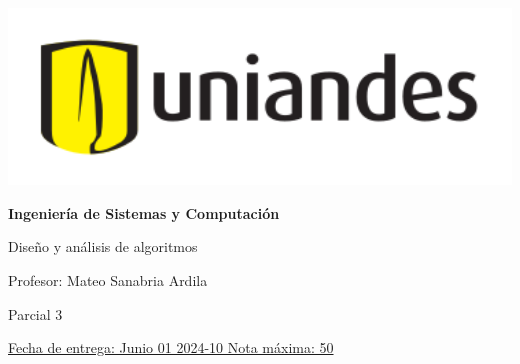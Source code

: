 \documentclass[12pt, a4paper]{exam}
\begin{document}
	\noindent
	\begin{minipage}[l]{0.1\textwidth}
		\noindent
		\includegraphics[width=1.8\textwidth]{Logosimbolo-uniandes_horizontal.png}
	\end{minipage}
\hfill
\begin{minipage}[c]{0.8\textwidth}
	\begin{center}
		{\large \textbf{Ingeniería de Sistemas y Computación} \par
		\large	Diseño y análisis de algoritmos	\par
		\small  Profesor: Mateo Sanabria Ardila	\par
		\small  Parcial 3	\par
		}
	\end{center}
\end{minipage}
\par
\vspace{0.2in}
\noindent
\uline{Fecha de entrega: Junio 01 	\hfill  2024-10		\hfill Nota máxima: 50}
\par 
\vspace{0.15in}
\end{document}
